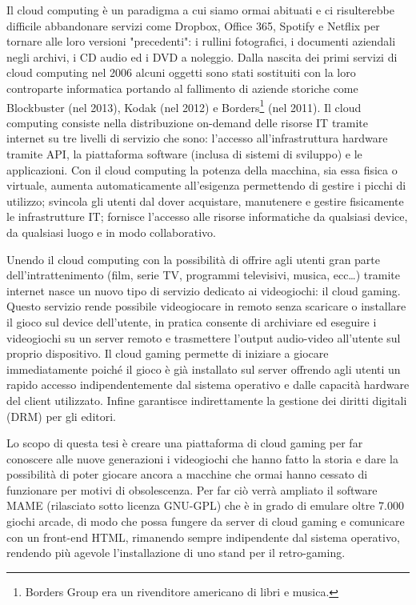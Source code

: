 Il cloud computing è un paradigma a cui siamo ormai abituati e ci risulterebbe difficile abbandonare servizi come Dropbox, Office 365, Spotify e Netflix per tornare alle loro versioni "precedenti": i rullini fotografici, i documenti aziendali negli archivi, i CD audio ed i DVD a noleggio. Dalla nascita dei primi servizi di cloud computing nel 2006 alcuni oggetti sono stati sostituiti con la loro controparte informatica portando al fallimento di aziende storiche come Blockbuster (nel 2013), Kodak (nel 2012) e Borders\footnote{Borders Group era un rivenditore americano di libri e musica.} (nel 2011). Il cloud computing consiste nella distribuzione on-demand delle risorse IT tramite internet su tre livelli di servizio che sono: l'accesso all'infrastruttura hardware tramite API, la piattaforma software (inclusa di sistemi di sviluppo) e le applicazioni. Con il cloud computing la potenza della macchina, sia essa fisica o virtuale, aumenta automaticamente all'esigenza permettendo di gestire i picchi di utilizzo; svincola gli utenti dal dover acquistare, manutenere e gestire fisicamente le infrastrutture IT; fornisce l'accesso alle risorse informatiche da qualsiasi device, da qualsiasi luogo e in modo collaborativo.

Unendo il cloud computing con la possibilità di offrire agli utenti gran parte dell'intrattenimento (film, serie TV, programmi televisivi, musica, ecc\dots) tramite internet nasce un nuovo tipo di servizio dedicato ai videogiochi: il cloud gaming. Questo servizio rende possibile videogiocare in remoto senza scaricare o installare il gioco sul device dell'utente, in pratica consente di archiviare ed eseguire i videogiochi su un server remoto e trasmettere l'output audio-video all'utente sul proprio dispositivo. Il cloud gaming permette di iniziare a giocare immediatamente poiché il gioco è già installato sul server offrendo agli utenti un rapido accesso indipendentemente dal sistema operativo e dalle capacità hardware del client utilizzato. Infine garantisce indirettamente la gestione dei diritti digitali (DRM) per gli editori.

Lo scopo di questa tesi è creare una piattaforma di cloud gaming per far conoscere alle nuove generazioni i videogiochi che hanno fatto la storia e dare la possibilità di poter giocare ancora a macchine che  ormai hanno cessato di funzionare per motivi di obsolescenza. Per far ciò verrà ampliato il software MAME (rilasciato sotto licenza GNU-GPL) che è in grado di emulare oltre 7.000 giochi arcade, di modo che possa fungere da server di cloud gaming e comunicare con un front-end HTML, rimanendo sempre indipendente dal sistema operativo, rendendo più agevole l’installazione di uno stand per il retro-gaming.


